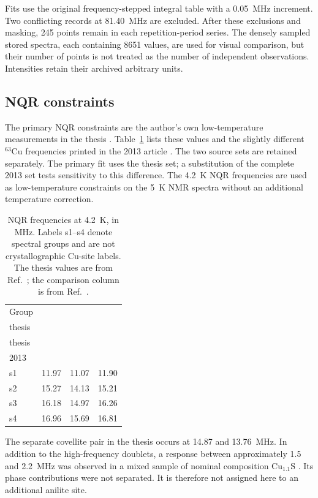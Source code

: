 \documentclass[10pt,a4paper,twocolumn]{article}
\begin{document}
Fits use the original frequency-stepped integral table with a 0.05~MHz increment. Two conflicting records at 81.40~MHz are excluded. After these exclusions and masking, 245 points remain in each repetition-period series. The densely sampled stored spectra, each containing 8651 values, are used for visual comparison, but their number of points is not treated as the number of independent observations. Intensities retain their archived arbitrary units.

\subsection{NQR constraints}

The primary NQR constraints are the author's own low-temperature measurements in the thesis \citep[p.~21]{Evlampiev2009}. Table~\ref{tab:nqr} lists these values and the slightly different $^{63}$Cu frequencies printed in the 2013 article \citep{Gainov2013}. The two source sets are retained separately. The primary fit uses the thesis set; a substitution of the complete 2013 set tests sensitivity to this difference. The 4.2~K NQR frequencies are used as low-temperature constraints on the 5~K NMR spectra without an additional temperature correction.

\begin{table}[t]
\centering
\caption{NQR frequencies at 4.2~K, in MHz. Labels s1--s4 denote spectral groups and are not crystallographic Cu-site labels. The thesis values are from Ref.~; the comparison column is from Ref.~.}
\label{tab:nqr}
\begin{tabular}{lrrr}
\toprule
Group & \shortstack{$^{63}$Cu\\thesis} & \shortstack{$^{65}$Cu\\thesis} & \shortstack{$^{63}$Cu\\2013} \\
\midrule
s1 & 11.97 & 11.07 & 11.90 \\
s2 & 15.27 & 14.13 & 15.21 \\
s3 & 16.18 & 14.97 & 16.26 \\
s4 & 16.96 & 15.69 & 16.81 \\
\bottomrule
\end{tabular}
\end{table}

The separate covellite pair in the thesis occurs at 14.87 and 13.76~MHz. In addition to the high-frequency doublets, a response between approximately 1.5 and 2.2~MHz was observed in a mixed sample of nominal composition Cu$_{1.1}$S \citep[pp.~22--23, Fig.~8]{Evlampiev2009}. Its phase contributions were not separated. It is therefore not assigned here to an additional anilite site.
\end{document}
